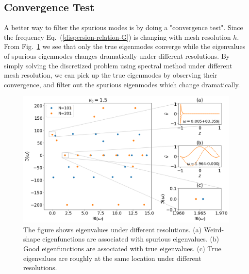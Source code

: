 \subsection{Convergence Test}
A better way to filter the spurious modes is by doing a "convergence test". Since the frequency Eq.~(\ref{dispersion-relation-G}) is changing with mesh resolution $h$. From Fig.~\ref{fig:convergence-test} we see that only the true eigenmodes converge while the eigenvalues of spurious eigenmodes changes dramatically under different resolutions. By simply solving the discretized problem using spectral method under different mesh resolution, we can pick up the true eigenmodes by observing their convergence, and filter out the spurious eigenmodes which change dramatically.

\begin{figure} [htbp]
	\centering
	\includegraphics[width=\textwidth]{figures/eigenvalues-eigenfunctions-convergence.png}
	\caption{The figure shows eigenvalues under different resolutions. (a)
		Weird-shape eigenfunctions are associated with spurious eigenvalues. (b) Good
		eigenfunctions are associated with true eigenvalues. (c) True eigenvalues are
		roughly at the same location under different resolutions.}
	\label{fig:convergence-test}
\end{figure}